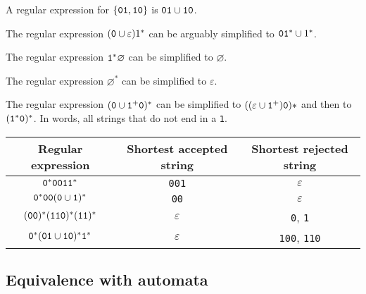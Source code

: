 \documentclass{notes}
\begin{document}
\begin{eg}
  A regular expression for $\left \{ \verb~01~, \verb~10~ \right \}$ is $\verb~01~ \cup \verb~10~$.
\end{eg}

\begin{eg}
  The regular expression $(\verb~0~ \cup \varepsilon) 1^*$ can be arguably simplified to $\verb~01~^* \cup 1^*$.
\end{eg}

\newpage

\begin{eg}
  The regular expression $\verb~1~^* \varnothing$ can be simplified to $\varnothing$.
\end{eg}

\begin{eg}
  The regular expression $\varnothing^*$ can be simplified to $\varepsilon$.
\end{eg}

\begin{eg}
  The regular expression $(\verb~0~ \cup \verb~1~^+ \verb~0~)^*$ can be simplified to $((\varepsilon \cup \verb~1~^+) \verb~0~)*$ and then to $(\verb~1~^* \verb~0~)^*$.
  In words, all strings that do not end in a \verb~1~.
\end{eg}

\begin{eg}
  \begin{center}
    \begin{tabular}{c|c|c}
      Regular expression & Shortest accepted string & Shortest rejected string \\ 
      \hline
      $\verb~0~^* \verb~0011~^*$ & \verb~001~ & $\varepsilon$ \\ 
      $\verb~0~^* \verb~00~ (\verb~0~ \cup \verb~1~)^*$ & \verb~00~ & $\varepsilon$ \\ 
      $(\verb~00~)^* (\verb~110~)^* (\verb~11~)^*$ & $\varepsilon$ & \verb~0~, \verb~1~ \\ 
      $\verb~0~^* (\verb~01~ \cup \verb~10~)^* \verb~1~^*$ & $\varepsilon$ & \verb~100~, \verb~110~
    \end{tabular}
  \end{center}
\end{eg}

\newpage

\subsection{Equivalence with automata}
\end{document}
